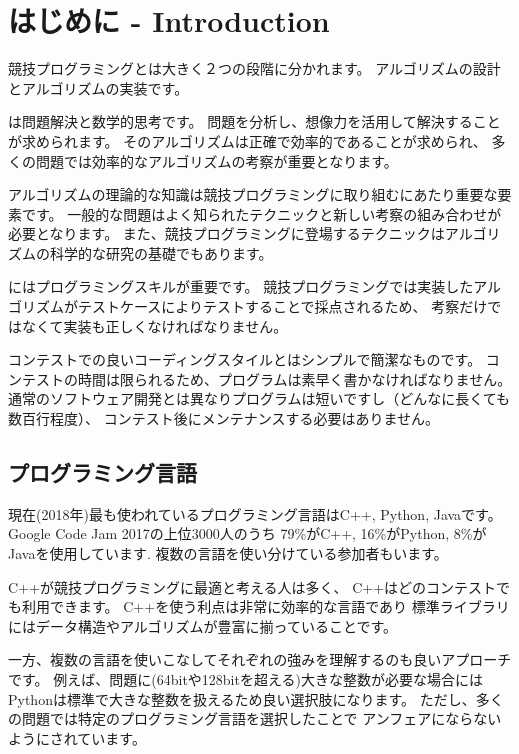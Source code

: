 \chapter{はじめに - Introduction}

競技プログラミングとは大きく２つの段階に分かれます。
アルゴリズムの設計とアルゴリズムの実装です。

は問題解決と数学的思考です。
問題を分析し、想像力を活用して解決することが求められます。
そのアルゴリズムは正確で効率的であることが求められ、
多くの問題では効率的なアルゴリズムの考察が重要となります。

アルゴリズムの理論的な知識は競技プログラミングに取り組むにあたり重要な要素です。
一般的な問題はよく知られたテクニックと新しい考察の組み合わせが必要となります。
また、競技プログラミングに登場するテクニックはアルゴリズムの科学的な研究の基礎でもあります。

にはプログラミングスキルが重要です。
競技プログラミングでは実装したアルゴリズムがテストケースによりテストすることで採点されるため、
考察だけではなくて実装も正しくなければなりません。

コンテストでの良いコーディングスタイルとはシンプルで簡潔なものです。
コンテストの時間は限られるため、プログラムは素早く書かなければなりません。
通常のソフトウェア開発とは異なりプログラムは短いですし（どんなに長くても数百行程度）、
コンテスト後にメンテナンスする必要はありません。

\section{プログラミング言語}


現在(2018年)最も使われているプログラミング言語はC++, Python, Javaです。
Google Code Jam 2017の上位3000人のうち
79\%がC++,
16\%がPython,
8\%がJavaを使用しています\cite{goo17}.
複数の言語を使い分けている参加者もいます。

C++が競技プログラミングに最適と考える人は多く、
C++はどのコンテストでも利用できます。
C++を使う利点は非常に効率的な言語であり
標準ライブラリにはデータ構造やアルゴリズムが豊富に揃っていることです。

一方、複数の言語を使いこなしてそれぞれの強みを理解するのも良いアプローチです。
例えば、問題に(64bitや128bitを超える)大きな整数が必要な場合には
Pythonは標準で大きな整数を扱えるため良い選択肢になります。
ただし、多くの問題では特定のプログラミング言語を選択したことで
アンフェアにならないようにされています。


